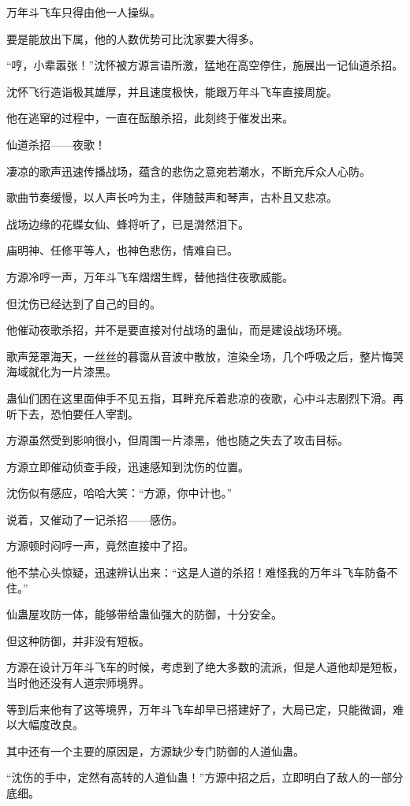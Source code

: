 \begin{this_body}
万年斗飞车只得由他一人操纵。

要是能放出下属，他的人数优势可比沈家要大得多。

“哼，小辈嚣张！”沈怀被方源言语所激，猛地在高空停住，施展出一记仙道杀招。

沈怀飞行造诣极其雄厚，并且速度极快，能跟万年斗飞车直接周旋。

他在逃窜的过程中，一直在酝酿杀招，此刻终于催发出来。

仙道杀招——夜歌！

凄凉的歌声迅速传播战场，蕴含的悲伤之意宛若潮水，不断充斥众人心防。

歌曲节奏缓慢，以人声长吟为主，伴随鼓声和琴声，古朴且又悲凉。

战场边缘的花蝶女仙、蜂将听了，已是潸然泪下。

庙明神、任修平等人，也神色悲伤，情难自已。

方源冷哼一声，万年斗飞车熠熠生辉，替他挡住夜歌威能。

但沈伤已经达到了自己的目的。

他催动夜歌杀招，并不是要直接对付战场的蛊仙，而是建设战场环境。

歌声笼罩海天，一丝丝的暮霭从音波中散放，渲染全场，几个呼吸之后，整片悔哭海域就化为一片漆黑。

蛊仙们困在这里面伸手不见五指，耳畔充斥着悲凉的夜歌，心中斗志剧烈下滑。再听下去，恐怕要任人宰割。

方源虽然受到影响很小，但周围一片漆黑，他也随之失去了攻击目标。

方源立即催动侦查手段，迅速感知到沈伤的位置。

沈伤似有感应，哈哈大笑：“方源，你中计也。”

说着，又催动了一记杀招——感伤。

方源顿时闷哼一声，竟然直接中了招。

他不禁心头惊疑，迅速辨认出来：“这是人道的杀招！难怪我的万年斗飞车防备不住。”

仙蛊屋攻防一体，能够带给蛊仙强大的防御，十分安全。

但这种防御，并非没有短板。

方源在设计万年斗飞车的时候，考虑到了绝大多数的流派，但是人道他却是短板，当时他还没有人道宗师境界。

等到后来他有了这等境界，万年斗飞车却早已搭建好了，大局已定，只能微调，难以大幅度改良。

其中还有一个主要的原因是，方源缺少专门防御的人道仙蛊。

“沈伤的手中，定然有高转的人道仙蛊！”方源中招之后，立即明白了敌人的一部分底细。


\end{this_body}
